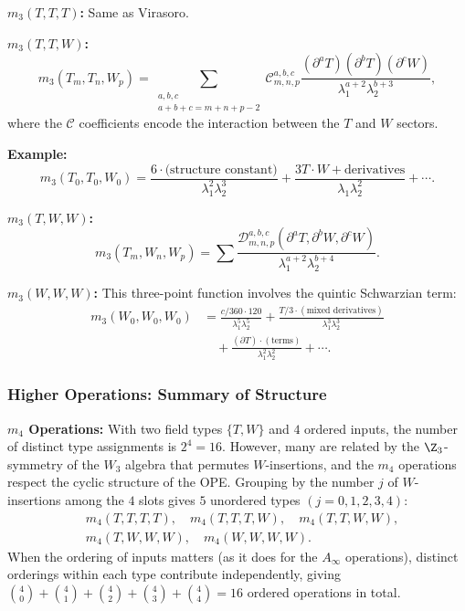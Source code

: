 \textbf{$m_3(T,T,T)$:} Same as Virasoro.

\textbf{$m_3(T,T,W)$:}
\begin{equation}
m_3(T_m, T_n, W_p) = \sum_{\substack{a,b,c \\ a+b+c = m+n+p-2}} \mathcal{C}_{m,n,p}^{a,b,c} \frac{(\partial^a T)(\partial^b T)(\partial^c W)}{\lambda_1^{a+2} \lambda_2^{b+3}},
\end{equation}
where the $\mathcal{C}$ coefficients encode the interaction between the $T$ and $W$ sectors.

\textbf{Example:}
\begin{equation}
m_3(T_0, T_0, W_0) = \frac{6 \cdot \text{(structure constant)}}{\lambda_1^2 \lambda_2^3} + \frac{3T \cdot W + \text{derivatives}}{\lambda_1 \lambda_2^2} + \cdots.
\end{equation}

\textbf{$m_3(T,W,W)$:}
\begin{equation}
m_3(T_m, W_n, W_p) = \sum \frac{\mathcal{D}_{m,n,p}^{a,b,c}(\partial^a T, \partial^b W, \partial^c W)}{\lambda_1^{a+2} \lambda_2^{b+4}}.
\end{equation}

\textbf{$m_3(W,W,W)$:} This three-point function involves the quintic Schwarzian term:
\begin{align}
m_3(W_0, W_0, W_0) &= \frac{c/360 \cdot 120}{\lambda_1^5 \lambda_2^5} + \frac{T/3 \cdot (\text{mixed derivatives})}{\lambda_1^3 \lambda_2^3}\\
&\quad + \frac{(\partial T) \cdot (\text{terms})}{\lambda_1^2 \lambda_2^2} + \cdots.
\end{align}

\subsubsection{Higher Operations: Summary of Structure}

\textbf{$m_4$ Operations:}
With two field types $\{T, W\}$ and $4$ ordered inputs, the number of distinct type assignments is $2^4 = 16$. However, many are related by the $\Z_3$-symmetry of the $W_3$ algebra that permutes $W$-insertions, and the $m_4$ operations respect the cyclic structure of the OPE. Grouping by the number $j$ of $W$-insertions among the $4$ slots gives $5$ unordered types $(j = 0,1,2,3,4)$:
\begin{align}
&m_4(T,T,T,T), \quad m_4(T,T,T,W), \quad m_4(T,T,W,W),\\
&m_4(T,W,W,W), \quad m_4(W,W,W,W).
\end{align}
When the ordering of inputs matters (as it does for the $A_\infty$ operations), distinct orderings within each type contribute independently, giving $\binom{4}{0} + \binom{4}{1} + \binom{4}{2} + \binom{4}{3} + \binom{4}{4} = 16$ ordered operations in total.

